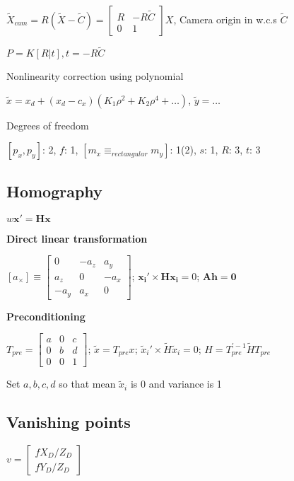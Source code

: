 \documentclass{article}
\begin{document}
\begin{multicols*}{2}
{	$\tilde{X}_{cam} = R(\tilde{X}-\tilde{C}) =
		\left[ \begin{array}{cc}
				R & -R\tilde{C} \\
				0 & 1
			\end{array} \right] X$, Camera origin in w.c.s $\tilde{C}$

	$P = K[R|t], t=-R\tilde{C}$

	Nonlinearity correction using polynomial

	$\tilde{x} = x_d + (x_d - c_x)(K_1\rho^2+K_2\rho^4+\dots)$, $\tilde{y} = \dots$

	Degrees of freedom

	$[p_x, p_y]$: 2, $f$: 1, $[m_x \equiv_{rectangular} m_y]$: 1(2), $s$: 1, $R$: 3, $t$: 3

	\subsection{Homography}

	$w \mathbf{x' = H x}$

	\textbf{Direct linear transformation}

	$[a_\times]\equiv \left[ \begin{array}{ccc}
				0    & -a_z & a_y  \\
				a_z  & 0    & -a_x \\
				-a_y & a_x  & 0
			\end{array} \right]$;
	$\mathbf{x_i' \times H x_i} = 0$; $\mathbf{Ah = 0}$

	\textbf{Preconditioning}

	$T_{pre} = \left[ \begin{array}{ccc}
				a & 0 & c \\
				0 & b & d \\
				0 & 0 & 1
			\end{array} \right]$;
	$\tilde{x} = T_{pre}x$;
	$\tilde{x}_i' \times \tilde{H} \tilde{x}_i = 0$;
	$H = T_{pre}^{'-1} \tilde{H} T_{pre}$

	Set $a,b,c,d$ so that mean $\tilde{x}_i$ is 0 and variance is 1

	\subsection{Vanishing points}

	$v = \left[ \begin{array}{c}
				f X_D / Z_D \\
				f Y_D / Z_D
			\end{array} \right]$

}
\end{multicols*}
\end{document}
